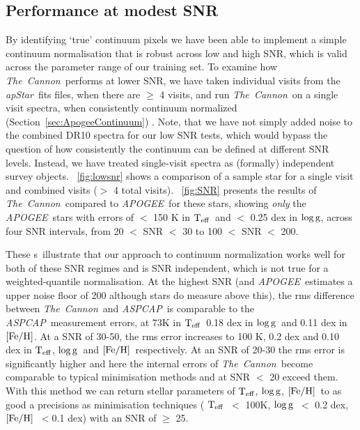 \documentclass[12pt, preprint]{aastex}
\newcommand{\sectionname}{Section}
\newcommand{\figurenames}{\figurename s}
\newcommand{\tc}{\textsl{The~Cannon}}
\newcommand{\apogee}{\textsl{APOGEE}}
\newcommand{\aspcap}{\textsl{ASPCAP}}
\newcommand{\apstar}{\textsl{apStar}}
\newcommand{\teff}{\mbox{$\rm T_{eff}$}}
\newcommand{\feh}{\mbox{$\rm [Fe/H]$}}
\newcommand{\logg}{\mbox{$\rm \log g$}}
\begin{document}
 \subsection{Performance at modest SNR}
 \label{sec:lowSNR}


By identifying `true' continuum pixels we have been able to implement a simple continuum normalisation that is robust across low and high SNR, which is valid across the parameter range of our training set. To examine how \tc\ performs at lower SNR, we have taken individual visits from the \apstar\ fits files, when there are $\ge$ 4 visits, and run \tc\ on a single visit spectra, when consistently continuum normalized (\sectionname~\ref{sec:ApogeeContinuum}) . Note, that we have not simply added noise to the combined DR10 spectra for our low SNR tests, which would bypass the question of how consistently the continuum can be defined at different SNR levels. Instead, we have treated single-visit spectra as (formally) independent survey objects. \figurename~\ref{fig:lowsnr} shows a comparison of a sample star for a single visit and combined visits ($>$ 4 total visits). \figurename~\ref{fig:SNR} presents the results of \tc\ compared to \apogee\ for these stars, showing \textit{only} the \apogee\ stars with errors of $<$ 150 K in \teff\ and $<$ 0.25 dex in \logg, across four SNR intervals, from 20 $<$ SNR $<$ 30 to 100 $<$ SNR $<$ 200.

These \figurenames\ illustrate that our approach to continuum normalization works well for both of these SNR regimes and is SNR independent, which is not true for a weighted-quantile normalisation. At the highest SNR (and \apogee\ estimates a upper noise floor of 200 although stars do measure above this), the rms difference between \tc\ and \aspcap\ is comparable to the \aspcap\ measurement errors, at 73K in \teff\, 0.18 dex in \logg\ and 0.11 dex in \feh. At a SNR of 30-50, the rms error increases to 100 K, 0.2 dex and 0.10 dex in \teff, \logg\ and \feh\, respectively. At an SNR of 20-30 the rms error is significantly higher and here the internal errors of \tc\ become comparable to typical minimisation methods and at SNR $<$ 20 exceed them. With this method we can return stellar parameters of \teff, \logg, \feh\ to as good a precisions as minimisation techniques ( \teff\ $<$ 100K, \logg\ $<$ 0.2 dex, \feh\ $< $0.1 dex) with an SNR of $\ge$ 25. 
 
\end{document}
